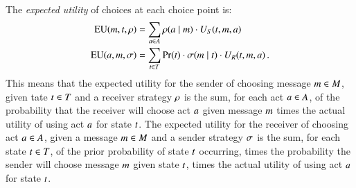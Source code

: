 \documentclass[fleqn,reqno,10pt]{article}
\begin{document}
The \emph{expected utility} of choices at each choice point is:
\begin{align*}
  \mathrm{EU}(m, t, \rho) & = \sum_{a \in A}
  \rho(a \mid m) \cdot U_S(t, m, a) \\
  \mathrm{EU}(a, m, \sigma) & = \sum_{t \in
    T} \Pr(t) \cdot \sigma(m \mid t) \cdot
  U_R(t, m, a) \,.
\end{align*}
This means that the expected utility for the sender of choosing message $m \in M$,
given tate $t \in T$ and a receiver strategy $\rho$ is the sum, for each act
$a \in A$, of the probability that the receiver will choose act $a$ given message
$m$ times the actual utility of using act $a$ for state $t$.  The expected utility
for the receiver of choosing act $a \in A$, given a message $m \in M$ and a
sender strategy $\sigma$ is the sum, for each state $t \in T$, of the prior
probability of state $t$ occurring, times the probability the sender will choose message
$m$ given state $t$, times the actual utility of using act $a$ for state $t$.

\end{document}
